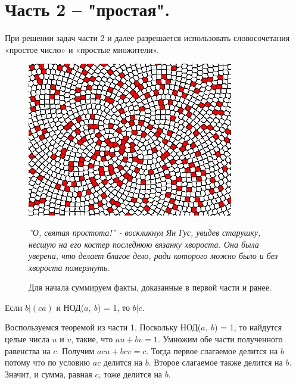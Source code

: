 
\section{Часть 2 -- "простая".}

\begin{center}
    При решении задач части 2 и далее разрешается использовать словосочетания «простое число» и «простые множители».
\end{center}

\begin{figure}[H]
\begin{minipage}{0.3\linewidth}
    \includegraphics[width=0.95\columnwidth]{img/10.8 img1.jpg}
\end{minipage}
    \hfill
\begin{minipage}{0.5\linewidth}
    \footnotesize{\textit{''О, святая простота!'' - воскликнул Ян Гус, увидев старушку, несшую на его костер последнюю вязанку хвороста. Она была уверена, что делает благое дело, ради которого можно было и без хвороста померзнуть.}}
    \par
    \bigskip
    \normalsize{Для начала суммируем факты, доказанные в первой части и ранее.}
\end{minipage}
\end{figure}

\begin{state} \label{10.8 state1}
    Если $b | (ca)$ и НОД($a,~b$) = 1, то $b | c$.
\end{state}

\begin{dok}
    Воспользуемся теоремой из части 1. Поскольку НОД($a,~b$) = 1, то найдутся целые числа $u$ и $v$, такие, что $au + bv = 1$. Умножим обе части полученного равенства на $c$. Получим $acu + bcv = c$. Тогда первое слагаемое делится на $b$ потому что по условию $ac$ делится на $b$. Второе слагаемое также делится на $b$. Значит, и сумма, равная $c$, тоже делится на $b$.
\end{dok}

